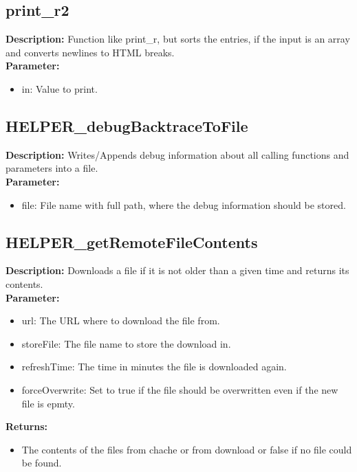 \subsection{print\_r2}
\textbf{Description:} Function like print\_r, but sorts the entries, if the input is an array and converts newlines to HTML breaks.\\
\textbf{Parameter:}
\begin{itemize}
\item in: Value to print.
\end{itemize}

\subsection{HELPER\_debugBacktraceToFile}
\textbf{Description:} Writes/Appends debug information about all calling functions and parameters into a file.\\
\textbf{Parameter:}
\begin{itemize}
\item file: File name with full path, where the debug information should be stored.
\end{itemize}

\subsection{HELPER\_getRemoteFileContents}
\textbf{Description:} Downloads a file if it is not older than a given time and returns its contents.\\
\textbf{Parameter:}
\begin{itemize}
\item url: The URL where to download the file from.
\item storeFile: The file name to store the download in.
\item refreshTime: The time in minutes the file is downloaded again.
\item forceOverwrite: Set to true if the file should be overwritten even if the new file is epmty.
\end{itemize}
\textbf{Returns:}
\begin{itemize}
\item The contents of the files from chache or from download or false if no file could be found.
\end{itemize}

